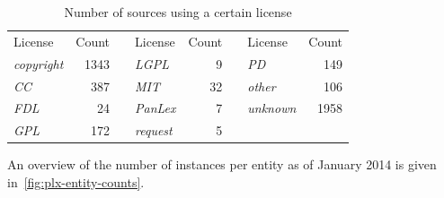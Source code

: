 \documentclass[sw]{iosart2c}
\begin{document}
\begin{table}
\centering
\begin{scriptsize}
\begin{tabular}{lrclrclr}
License          & Count &&
License          & Count &&
License          & Count \\
\cline{1-2} \cline{4-5} \cline{7-8}
\emph{copyright} &  1343  && \emph{LGPL}      &     9 && \emph{PD}           & 149 \\
\emph{CC}          &   387   && \emph{MIT}         &    32 && \emph{other}       &   106 \\
\emph{FDL}        &    24    && \emph{PanLex}    &    7 && \emph{unknown}  &  1958 \\
\emph{GPL}        &   172   && \emph{request}    &     5 \\
\end{tabular}
\end{scriptsize}
\caption{Number of sources using a certain license}
\label{tbl:plx-license-counts}
\end{table}

An overview of the number of instances per entity as of January 2014 is given in~\autoref{fig:plx-entity-counts}.
\end{document}

